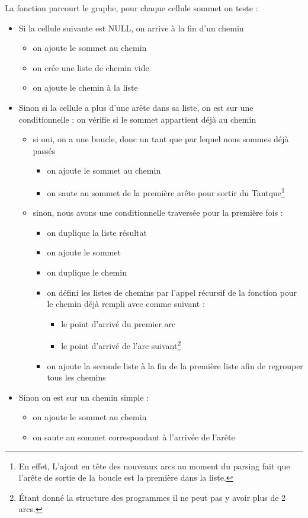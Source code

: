 \documentclass[a4paper,11pt]{article}
\begin{document}
		La fonction parcourt le graphe, pour chaque cellule sommet on teste :
	\begin{itemize}
	\item Si la cellule suivante est NULL, on arrive à la fin d'un chemin
		\begin{itemize}
		\item on ajoute le sommet au chemin
		\item on crée une liste de chemin vide
		\item on ajoute le chemin à la liste
		\end{itemize}
	\item Sinon si la cellule a plus d'une arête dans sa liste, on est sur une conditionnelle : on vérifie si le sommet appartient déjà au chemin
			\begin{itemize}
			\item si oui, on a une boucle, donc un tant que par lequel nous sommes déjà passés
				\begin{itemize}
				\item on ajoute le sommet au chemin
				\item on saute au sommet de la première arête pour sortir du Tantque\footnote{En effet, L'ajout en tête des nouveaux arcs au moment du parsing fait que l'arête de sortie de la boucle est la première dans la liste.}
				\end{itemize}
			\item sinon, nous avons une conditionnelle traversée pour la première fois :
				\begin{itemize}
				\item on duplique la liste résultat
				\item on ajoute le sommet
				\item on duplique le chemin
				\item on défini les listes de chemins par l'appel récursif de la fonction pour le chemin déjà rempli avec comme suivant :
					\begin{itemize}
					\item le point d'arrivé du premier arc
					\item le point d'arrivé de l'arc suivant\footnote{Étant donné la structure des programmes il ne peut pas y avoir plus de 2 arcs.}
					\end{itemize}
				\item on ajoute la seconde liste à la fin de la première liste afin de regrouper tous les chemins
				\end{itemize}
			\end{itemize}
		\item Sinon on est sur un chemin simple :
			\begin{itemize}
			\item on ajoute le sommet au chemin
			\item on saute au sommet correspondant à l'arrivée de l'arête
			\end{itemize}
		\end{itemize}
\end{document}
